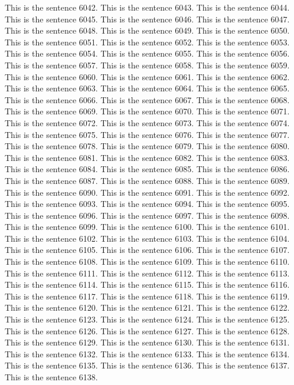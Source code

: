 \documentclass{article}
\begin{document}
This is the sentence 6042.
This is the sentence 6043.
This is the sentence 6044.
This is the sentence 6045.
This is the sentence 6046.
This is the sentence 6047.
This is the sentence 6048.
This is the sentence 6049.
This is the sentence 6050.
This is the sentence 6051.
This is the sentence 6052.
This is the sentence 6053.
This is the sentence 6054.
This is the sentence 6055.
This is the sentence 6056.
This is the sentence 6057.
This is the sentence 6058.
This is the sentence 6059.
This is the sentence 6060.
This is the sentence 6061.
This is the sentence 6062.
This is the sentence 6063.
This is the sentence 6064.
This is the sentence 6065.
This is the sentence 6066.
This is the sentence 6067.
This is the sentence 6068.
This is the sentence 6069.
This is the sentence 6070.
This is the sentence 6071.
This is the sentence 6072.
This is the sentence 6073.
This is the sentence 6074.
This is the sentence 6075.
This is the sentence 6076.
This is the sentence 6077.
This is the sentence 6078.
This is the sentence 6079.
This is the sentence 6080.
This is the sentence 6081.
This is the sentence 6082.
This is the sentence 6083.
This is the sentence 6084.
This is the sentence 6085.
This is the sentence 6086.
This is the sentence 6087.
This is the sentence 6088.
This is the sentence 6089.
This is the sentence 6090.
This is the sentence 6091.
This is the sentence 6092.
This is the sentence 6093.
This is the sentence 6094.
This is the sentence 6095.
This is the sentence 6096.
This is the sentence 6097.
This is the sentence 6098.
This is the sentence 6099.
This is the sentence 6100.
This is the sentence 6101.
This is the sentence 6102.
This is the sentence 6103.
This is the sentence 6104.
This is the sentence 6105.
This is the sentence 6106.
This is the sentence 6107.
This is the sentence 6108.
This is the sentence 6109.
This is the sentence 6110.
This is the sentence 6111.
This is the sentence 6112.
This is the sentence 6113.
This is the sentence 6114.
This is the sentence 6115.
This is the sentence 6116.
This is the sentence 6117.
This is the sentence 6118.
This is the sentence 6119.
This is the sentence 6120.
This is the sentence 6121.
This is the sentence 6122.
This is the sentence 6123.
This is the sentence 6124.
This is the sentence 6125.
This is the sentence 6126.
This is the sentence 6127.
This is the sentence 6128.
This is the sentence 6129.
This is the sentence 6130.
This is the sentence 6131.
This is the sentence 6132.
This is the sentence 6133.
This is the sentence 6134.
This is the sentence 6135.
This is the sentence 6136.
This is the sentence 6137.
This is the sentence 6138.
\end{document}

